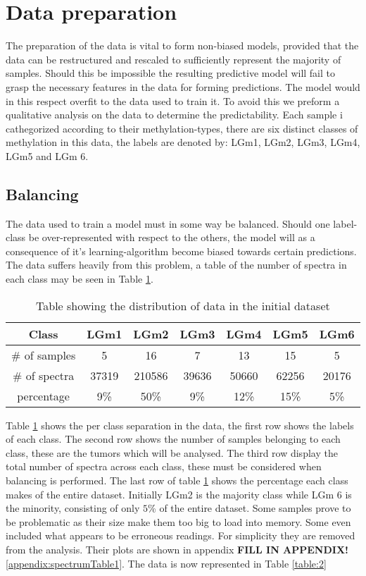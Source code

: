 \section{Data preparation}
The preparation of the data is vital to form non-biased models, provided that the data can be restructured and rescaled to sufficiently represent the majority of samples. Should this be impossible the resulting predictive model will fail to grasp the necessary features in the data for forming predictions. The model would in this respect overfit to the data used to train it. To avoid this we preform a qualitative analysis on the data to determine the predictability. Each sample i cathegorized according to their methylation-types, there are six distinct classes of methylation in this data, the labels are denoted by: LGm1, LGm2, LGm3, LGm4, LGm5 and LGm 6.

\subsection{Balancing}
The data used to train a model must in some way be balanced. Should one label-class be over-represented with respect to the others, the model will as a consequence of it's learning-algorithm become biased towards certain predictions. The data suffers heavily from this problem, a table of the number of spectra in each class may be seen in Table \ref{table:1}.
\\

\begin{table}[h!]
\centering
 \begin{tabular}{||c c c c c c c||} 
 \hline
 Class & LGm1 & LGm2 & LGm3 & LGm4 & LGm5 & LGm6 \\ [0.5ex] 
 \hline\hline
 \# of samples & 5& 16 & 7 & 13 & 15 & 5 \\ 
 \hline
 \# of spectra & 37319 & 210586 & 39636 & 50660 & 62256 & 20176 \\
 \hline
 percentage & 9\%& 50\% & 9\% & 12\% & 15\% & 5\% \\
 \hline

\end{tabular}
\caption{Table showing the distribution of data in the initial dataset}
\label{table:1}
\end{table}

\newpage
Table \ref{table:1} shows the per class separation in the data, the first row shows the labels of each class. The second row shows the number of samples belonging to each class, these are the tumors which will be analysed. The third row display the total number of spectra across each class, these must be considered when balancing is performed. The last row of table \ref{table:1} shows the percentage each class makes of the entire dataset. Initially LGm2 is the majority class while LGm 6 is the minority, consisting of only $5$\% of the entire dataset. Some samples prove to be problematic as their size make them too big to load into memory. Some even included what appears to be erroneous readings. For simplicity they are removed from the analysis. Their plots are shown in appendix \textbf{FILL IN APPENDIX!}\ref{appendix:spectrumTable1}. The data is now represented in Table \ref{table:2}
\\

